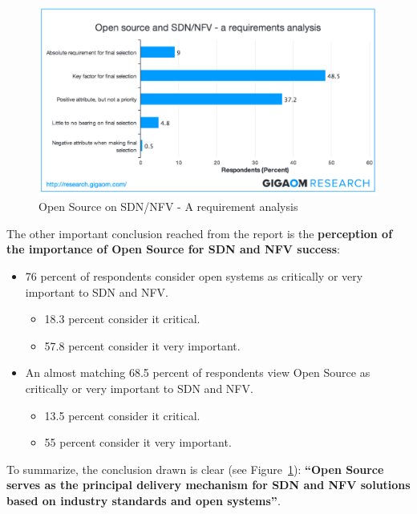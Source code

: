 \documentclass[a4paper, 12pt]{book}
\begin{document}
\begin{center}
 \begin{figure}
 \begin{center}
   \includegraphics[width=15cm]{img/open-source-requirement-operator-view-00.png}
   \caption{Open Source on SDN/NFV - A requirement analysis}
   \label{fig:sdn_hype_cyle}
 \end{center}
 \end{figure}
\end{center}
The other important conclusion reached from the report is the \textbf{perception of the importance of Open Source for SDN and NFV success}:
\begin{itemize}\itemsep0pt
\item{76 percent of respondents consider open systems as critically or very important to SDN and NFV}.
\begin{itemize}\itemsep0pt
\item{18.3 percent consider it critical.}
\item{57.8 percent consider it very important.}
\end{itemize}
\item{An almost matching 68.5 percent of respondents view Open Source as critically or very important to SDN and NFV}.
\begin{itemize}\itemsep0pt
\item{13.5 percent consider it critical.}
\item{55 percent consider it very important.}
\end{itemize}
\end{itemize}
To summarize, the conclusion drawn is clear (see Figure~\ref{fig:sdn_hype_cyle}): \textbf{``Open Source serves as the principal delivery mechanism for SDN and NFV solutions based on industry standards and open systems''}.
\end{document}
